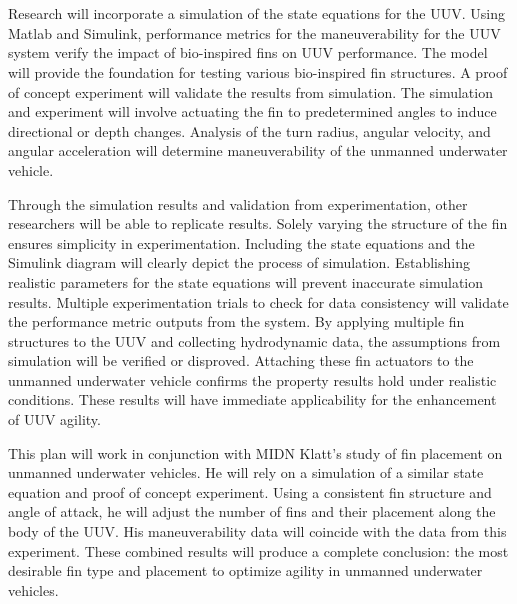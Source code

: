 \documentclass[]{IEEEtran}
\begin{document}
\section{}
Research will incorporate a simulation of the state equations for the UUV.  Using Matlab and Simulink, performance metrics for the maneuverability for the UUV system verify the impact of bio-inspired fins on UUV performance. The model will provide the foundation for testing various bio-inspired fin structures.  A proof of concept experiment will validate the results from simulation.  The simulation and experiment will involve actuating the fin to predetermined angles to induce directional or depth changes.  Analysis of the turn radius, angular velocity, and angular acceleration will determine maneuverability of the unmanned underwater vehicle.  

Through the simulation results and validation from experimentation, other researchers will be able to replicate results.  Solely varying the structure of the fin ensures simplicity in experimentation.  Including the state equations and the Simulink diagram will clearly depict the process of simulation.  Establishing realistic parameters for the state equations will prevent inaccurate simulation results.  Multiple experimentation trials to check for data consistency will validate the performance metric outputs from the system.  By applying multiple fin structures to the UUV and collecting hydrodynamic data, the assumptions from simulation will be verified or disproved.  Attaching these fin actuators to the unmanned underwater vehicle confirms the property results hold under realistic conditions.  These results will have immediate applicability for the enhancement of UUV agility.  

This plan will work in conjunction with MIDN Klatt’s study of fin placement on unmanned underwater vehicles.  He will rely on a simulation of a similar state equation and proof of concept experiment.  Using a consistent fin structure and angle of attack, he will adjust the number of fins and their placement along the body of the UUV.  His maneuverability data will coincide with the data from this experiment.  These combined results will produce a complete conclusion: the most desirable fin type and placement to optimize agility in unmanned underwater vehicles.
\end{document}
